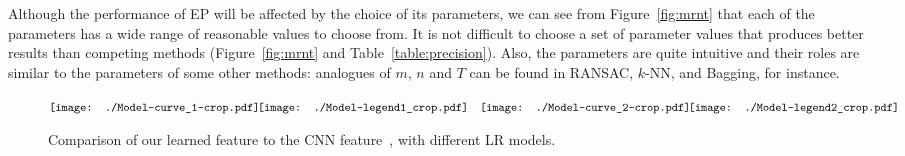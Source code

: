 \documentclass[preprint,12pt,3p]{elsarticle}
\begin{document}
Although the performance of EP will be affected by the choice of its
parameters, we can see from Figure~\ref{fig:mrnt} that each of the
parameters has a wide range of reasonable values to choose from. It is
not difficult to choose a set of parameter values that produces better
results than competing methods (\cf Figure~\ref{fig:mrnt} and
Table~\ref{table:precision}).  Also, the parameters are quite
intuitive and their roles are similar to the parameters of some
other methods: analogues of $m$, $n$ and $T$ can be found in
RANSAC, $k$-NN, and Bagging, for instance.



\begin{figure*} 
  \centering
   $ \begin{array}{cccc}
\hspace{-2mm}
\texttt{[image: ./Model-curve\_1-crop.pdf]} &  \hspace{-4mm}
\texttt{[image: ./Model-legend1\_crop.pdf]} &  
\texttt{[image: ./Model-curve\_2-crop.pdf]} &  \hspace{-4mm}
\texttt{[image: ./Model-legend2\_crop.pdf]} \\
\end{array}$
\caption{Comparison of our learned feature to the CNN feature~\cite{deep:bmvc14}, with different LR models.}
  \label{fig:classifiers}
\end{figure*}


\end{document}
